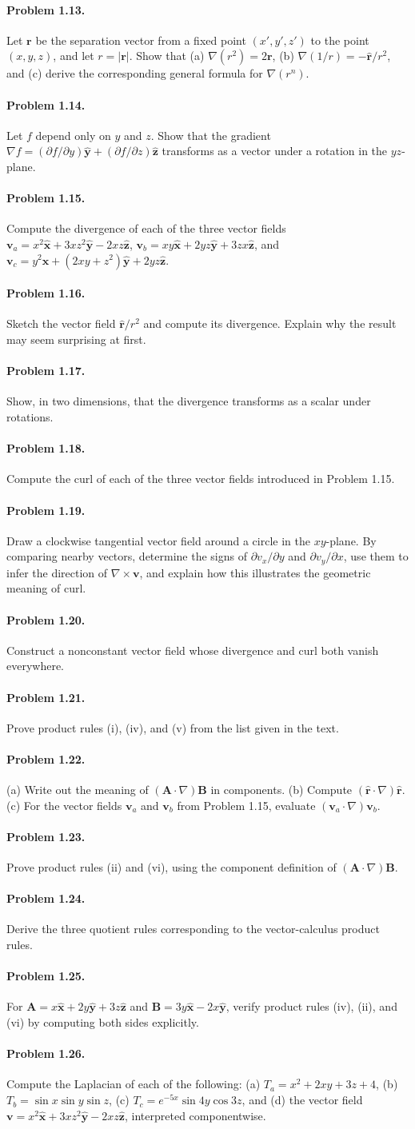 \documentclass{aa}
\newcommand{\problemstatement}[2]{%
\paragraph{Problem #1.}#2\par\medskip
}
\begin{document}
\problemstatement{1.13}{Let \(\mathbf r\) be the separation vector from a fixed point \((x',y',z')\) to the point \((x,y,z)\), and let \(r=|\mathbf r|\). Show that (a) \(\nabla(r^2)=2\mathbf r\), (b) \(\nabla(1/r)=-\hat{\mathbf r}/r^2\), and (c) derive the corresponding general formula for \(\nabla(r^n)\).}
\problemstatement{1.14}{Let \(f\) depend only on \(y\) and \(z\). Show that the gradient \(\nabla f = (\partial f/\partial y)\hat{\mathbf y}+(\partial f/\partial z)\hat{\mathbf z}\) transforms as a vector under a rotation in the \(yz\)-plane.}
\problemstatement{1.15}{Compute the divergence of each of the three vector fields \( \mathbf v_a = x^2\hat{\mathbf x}+3xz^2\hat{\mathbf y}-2xz\hat{\mathbf z}\), \( \mathbf v_b = xy\hat{\mathbf x}+2yz\hat{\mathbf y}+3zx\hat{\mathbf z}\), and \( \mathbf v_c = y^2\hat{\mathbf x}+(2xy+z^2)\hat{\mathbf y}+2yz\hat{\mathbf z}\).}
\problemstatement{1.16}{Sketch the vector field \(\hat{\mathbf r}/r^2\) and compute its divergence. Explain why the result may seem surprising at first.}
\problemstatement{1.17}{Show, in two dimensions, that the divergence transforms as a scalar under rotations.}
\problemstatement{1.18}{Compute the curl of each of the three vector fields introduced in Problem 1.15.}
\problemstatement{1.19}{Draw a clockwise tangential vector field around a circle in the \(xy\)-plane. By comparing nearby vectors, determine the signs of \(\partial v_x/\partial y\) and \(\partial v_y/\partial x\), use them to infer the direction of \(\nabla\times\mathbf v\), and explain how this illustrates the geometric meaning of curl.}
\problemstatement{1.20}{Construct a nonconstant vector field whose divergence and curl both vanish everywhere.}
\problemstatement{1.21}{Prove product rules (i), (iv), and (v) from the list given in the text.}
\problemstatement{1.22}{(a) Write out the meaning of \((\mathbf A\cdot\nabla)\mathbf B\) in components. (b) Compute \((\hat{\mathbf r}\cdot\nabla)\hat{\mathbf r}\). (c) For the vector fields \( \mathbf v_a \) and \( \mathbf v_b \) from Problem 1.15, evaluate \((\mathbf v_a\cdot\nabla)\mathbf v_b\).}
\problemstatement{1.23}{Prove product rules (ii) and (vi), using the component definition of \((\mathbf A\cdot\nabla)\mathbf B\).}
\problemstatement{1.24}{Derive the three quotient rules corresponding to the vector-calculus product rules.}
\problemstatement{1.25}{For \(\mathbf A = x\hat{\mathbf x}+2y\hat{\mathbf y}+3z\hat{\mathbf z}\) and \(\mathbf B = 3y\hat{\mathbf x}-2x\hat{\mathbf y}\), verify product rules (iv), (ii), and (vi) by computing both sides explicitly.}
\problemstatement{1.26}{Compute the Laplacian of each of the following: (a) \(T_a=x^2+2xy+3z+4\), (b) \(T_b=\sin x\sin y\sin z\), (c) \(T_c=e^{-5x}\sin 4y\cos 3z\), and (d) the vector field \(\mathbf v = x^2\hat{\mathbf x}+3xz^2\hat{\mathbf y}-2xz\hat{\mathbf z}\), interpreted componentwise.}
\end{document}
